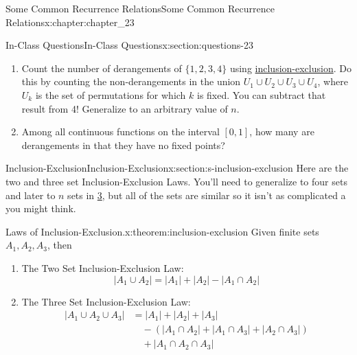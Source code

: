 \documentclass[oneside,10pt,]{book}
\numberwithin{equation}{section}
\begin{document}
\begin{chapterptx}{Some Common Recurrence Relations}{}{Some Common Recurrence Relations}{}{}{x:chapter:chapter_23}
\begin{sectionptx}{In-Class Questions}{}{In-Class Questions}{}{}{x:section:questions-23}
\begin{enumerate}[label=\arabic*.]
\item\hypertarget{x:li:p3}{}Count the number of derangements of \(\{1,2,3,4\}\) using \hyperref[x:section:s-inclusion-exclusion]{inclusion-exclusion}. Do this by counting the non-derangements in the union \(U_1 \cup U_2 \cup U_3 \cup U_4\), where \(U_k\) is the set of permutations for which \(k\) is fixed. You can subtract that result from 4!   Generalize to an arbitrary value of \(n\).%
\item{}Among all continuous functions on the interval \([0,1]\), how many are derangements in that they have no fixed points?%
\end{enumerate}
%
\end{sectionptx}
%
%
\typeout{************************************************}
\typeout{************************************************}
%
\begin{sectionptx}{Inclusion-Exclusion}{}{Inclusion-Exclusion}{}{}{x:section:s-inclusion-exclusion}
Here are the two and three set Inclusion-Exclusion Laws. You'll need to generalize to four sets and later to \(n\) sets in \hyperlink{x:li:p3}{3}, but all of the sets are similar so it isn't as complicated a you might think.%
\begin{theorem}{Laws of Inclusion-Exclusion.}{}{x:theorem:inclusion-exclusion}%
%
Given finite sets \(A_1, A_2, A_3\), then%
\begin{enumerate}[label=(\alph*)]
\item\hypertarget{x:li:ie2}{}The Two Set Inclusion-Exclusion Law:%
\begin{equation*}
\lvert A_1 \cup A_2 \rvert =\lvert A_1 \rvert + \lvert A_2 \rvert - \lvert A_1 \cap A_2 \rvert  
\end{equation*}
%
\item\hypertarget{x:li:ie3}{}The Three Set Inclusion-Exclusion Law:%
\begin{equation*}
\begin{split}
\lvert A_1 \cup A_2 \cup A_3 \rvert & =\lvert A_1 \rvert + \lvert A_2 \rvert + \lvert A_3 \rvert\\
&\quad - (\lvert A_1 \cap A_2 \rvert + \lvert A_1 \cap A_3 \rvert+ \lvert A_2 \cap A_3 \rvert)\\
&\quad + \lvert A_1 \cap A_2 \cap A_3 \rvert
\end{split} 
\end{equation*}
%
\end{enumerate}
%
\end{theorem}
\end{sectionptx}
\end{chapterptx}
\end{document}
